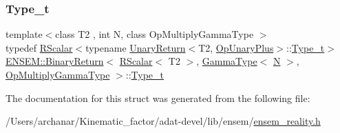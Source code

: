 \subsubsection{\texorpdfstring{Type\_t}{Type\_t}\hspace{0.1cm}{\footnotesize\ttfamily [3/3]}}
{\footnotesize\ttfamily template$<$class T2 , int N, class Op\+Multiply\+Gamma\+Type $>$ \\
typedef \mbox{\hyperlink{classENSEM_1_1RScalar}{R\+Scalar}}$<$typename \mbox{\hyperlink{structENSEM_1_1UnaryReturn}{Unary\+Return}}$<$T2, \mbox{\hyperlink{structENSEM_1_1OpUnaryPlus}{Op\+Unary\+Plus}}$>$\+::\mbox{\hyperlink{structENSEM_1_1BinaryReturn_3_01RScalar_3_01T2_01_4_00_01GammaType_3_01N_01_4_00_01OpMultiplyGammaType_01_4_a955e89f0808a9e6fa6129e9fb9f12d6b}{Type\+\_\+t}}$>$ \mbox{\hyperlink{structENSEM_1_1BinaryReturn}{E\+N\+S\+E\+M\+::\+Binary\+Return}}$<$ \mbox{\hyperlink{classENSEM_1_1RScalar}{R\+Scalar}}$<$ T2 $>$, \mbox{\hyperlink{classENSEM_1_1GammaType}{Gamma\+Type}}$<$ \mbox{\hyperlink{adat__devel_2lib_2hadron_2operator__name__util_8cc_a7722c8ecbb62d99aee7ce68b1752f337}{N}} $>$, \mbox{\hyperlink{structENSEM_1_1OpMultiplyGammaType}{Op\+Multiply\+Gamma\+Type}} $>$\+::\mbox{\hyperlink{structENSEM_1_1BinaryReturn_3_01RScalar_3_01T2_01_4_00_01GammaType_3_01N_01_4_00_01OpMultiplyGammaType_01_4_a955e89f0808a9e6fa6129e9fb9f12d6b}{Type\+\_\+t}}}



The documentation for this struct was generated from the following file\+:\begin{DoxyCompactItemize}
\item 
/\+Users/archanar/\+Kinematic\+\_\+factor/adat-\/devel/lib/ensem/\mbox{\hyperlink{adat-devel_2lib_2ensem_2ensem__reality_8h}{ensem\+\_\+reality.\+h}}\end{DoxyCompactItemize}

